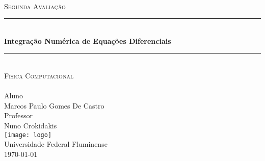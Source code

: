 \documentclass[pdftex,10pt,a4paper]{article}
\newcommand{\HRule}{\rule{\linewidth}{0.3mm}}
\begin{document}
\begin{titlepage}
\begin{center}
~\\[5.0cm]
\textsc{\large Segunda Avaliação}\\
\HRule \\[0.4cm]
{ \huge \bfseries Integração Numérica de Equações Diferenciais \\[0.4cm] }
\HRule \\[0.5cm]
\textsc{\Large Física Computacional}\\
~\\[3.5cm]
\noindent
\small Aluno\\
\large \textsc Marcos Paulo Gomes De Castro\\[0.2cm]
\small Professor\\
\large \textsc Nuno Crokidakis\\[0.2 cm]
\vfill
\texttt{[image: logo]}\\
\textsc Universidade Federal Fluminense\\ 

{\normalsize \today}
\end{center}
\end{titlepage}
\end{document}
